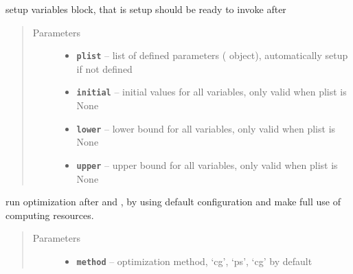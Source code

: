 \documentclass[letterpaper,10pt,english]{sphinxmanual}
\begin{document}
\begin{fulllineitems}
\begin{fulllineitems}
\begin{quote}
\begin{description}
\end{description}\end{quote}

\end{fulllineitems}


\begin{fulllineitems}
\label{src/apidocs/dakopt:genopt.dakopt.DakotaOC.set_variables}
setup variables block, that is setup 
should be ready to invoke after 
\begin{quote}\begin{description}
\item[{Parameters}] \leavevmode\begin{itemize}
\item {} 
\textbf{\texttt{plist}} -- list of defined parameters ( object), 
automatically setup if not defined

\item {} 
\textbf{\texttt{initial}} -- initial values for all variables, only valid when plist is None

\item {} 
\textbf{\texttt{lower}} -- lower bound for all variables, only valid when plist is None

\item {} 
\textbf{\texttt{upper}} -- upper bound for all variables, only valid when plist is None

\end{itemize}

\end{description}\end{quote}

\end{fulllineitems}


\begin{fulllineitems}
\label{src/apidocs/dakopt:genopt.dakopt.DakotaOC.simple_run}
run optimization after  and ,
by using default configuration and make full use of computing resources.
\begin{quote}\begin{description}
\item[{Parameters}] \leavevmode\begin{itemize}
\item {} 
\textbf{\texttt{method}} -- optimization method, `cg', `ps', `cg' by default


\end{itemize}
\end{description}
\end{quote}
\end{fulllineitems}
\end{fulllineitems}
\end{document}

